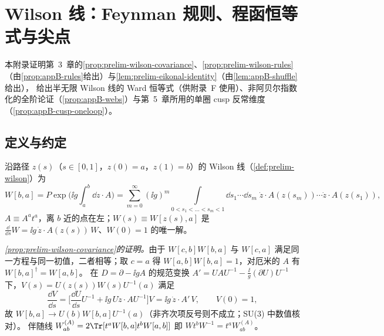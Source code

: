 \chapter{Wilson 线：Feynman 规则、程函恒等式与尖点}\label{app:appB}

本附录证明第~3~章的\cref{prop:prelim-wilson-covariance}、\cref{prop:prelim-wilson-rules}（由\cref{prop:appB-rules}给出）与\cref{lem:prelim-eikonal-identity}（由\cref{lem:appB-shuffle}给出），
给出半无限 Wilson 线的 Ward 恒等式（供附录~F 使用）、非阿贝尔指数化的全阶论证（\cref{prop:appB-webs}）与第~5~章所用的单圈 cusp 反常维度（\cref{prop:appB-cusp-oneloop}）。

\section{定义与约定}\label{sec:appB-definition}

沿路径 $z(s)$（$s\in[0,1]$，$z(0)=a$，$z(1)=b$）的 Wilson 线（\cref{def:prelim-wilson}）为
\begin{equation}\label{eq:appB-W}
W[b,a]=P\exp\Big(\ii g\int_a^b\dd z\cdot A\Big)=\sum_{m=0}^\infty(\ii g)^m\!\!\int\limits_{0<s_1<\dots<s_m<1}\!\!\dd s_1\cdots\dd s_m\;
\dot z\cdot A(z(s_m))\cdots\dot z\cdot A(z(s_1)),
\end{equation}
$A\equiv A^at^a$，离 $b$ 近的点在左；$W(s)\equiv W[z(s),a]$ 是 $\frac{\dd}{\dd s}W=\ii g\,\dot z\cdot A(z(s))\,W$、$W(0)=1$ 的唯一解。

\emph{\cref{prop:prelim-wilson-covariance}的证明。}由于 $W[c,b]W[b,a]$ 与 $W[c,a]$ 满足同一方程与同一初值，二者相等；取 $c=a$ 得 $W[a,b]W[b,a]=1$，对厄米的 $A$ 有 $W[b,a]^\dagger=W[a,b]$。
在 $D=\partial-\ii gA$ 的规范变换 $A'=UAU^{-1}-\frac{\ii}g(\partial U)U^{-1}$ 下，$V(s)=U(z(s))W(s)U^{-1}(a)$ 满足
\[
\frac{\dd V}{\dd s}=\Big[\frac{\dd U}{\dd s}U^{-1}+\ii g\,U\dot z\cdot AU^{-1}\Big]V=\ii g\,\dot z\cdot A'\,V,\qquad V(0)=1,
\]
故 $W[b,a]\to U(b)W[b,a]U^{-1}(a)$（非齐次项反号则不成立；SU(3) 中数值核对）。%
伴随线 $W^{(A)}_{ab}=2\Tr[t^aW[b,a]t^bW[a,b]]$ 即 $W t^bW^{-1}=t^aW^{(A)}_{ab}$。


